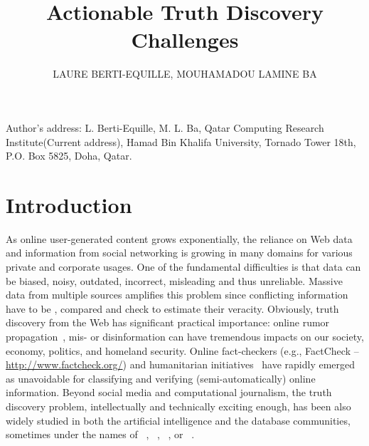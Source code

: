 \documentclass[prodmode,acmtecs]{acmsmall} %
\begin{document}
\title{Actionable Truth Discovery Challenges}
\author{LAURE BERTI-EQUILLE, MOUHAMADOU LAMINE BA
}



\begin{bottomstuff}
Author's address: L. Berti-Equille, M. L. Ba, Qatar Computing Research Institute(Current address), Hamad
Bin Khalifa University, Tornado Tower 18th, P.O. Box 5825, Doha, Qatar.
\end{bottomstuff}

\maketitle


\section{Introduction}
As online user-generated content grows exponentially, the reliance on Web data and information from social 
networking is growing in many domains for various private and corporate usages. 
One of the fundamental difficulties is that data can be biased, noisy, outdated, incorrect, misleading and
thus unreliable. Massive data from multiple sources amplifies this problem since conflicting information
have to be , compared  and check to estimate their veracity. Obviously, truth discovery from 
the Web has significant practical importance: online rumor propagation~\cite{rumor-icdm2013}, mis- or disinformation
can have tremendous impacts on our society, economy, politics, and homeland security. Online fact-checkers (e.g., FactCheck
-- \url{http://www.factcheck.org/}) and humanitarian initiatives~\cite{ImranECDM13} have rapidly emerged as unavoidable for 
classifying and verifying (semi-automatically) online information. Beyond social media and computational journalism, the truth
discovery problem, intellectually and technically exciting enough, has been also widely studied in both the artificial intelligence
and the database communities, sometimes under the names of  ~\cite{GoasdoueKKLMZ13}, ~\cite{Thirunarayan2014182}, ~\cite{PasternackR13}, or ~\cite{GallandAMS10}. 
\end{document}
